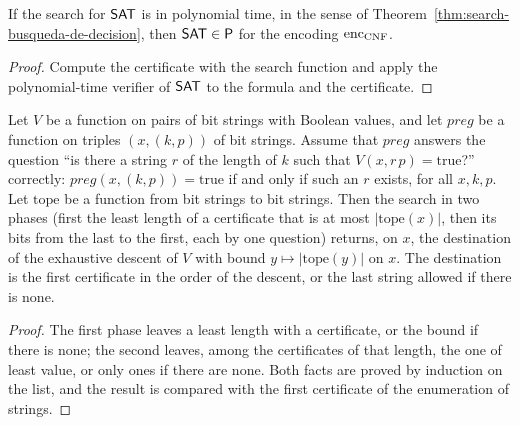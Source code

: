 \begin{theorem}
  \label{thm:search-decision-de-busqueda}
  \leanok
  If the search for $\mathsf{SAT}$ is in polynomial time, in the sense of
  Theorem~\ref{thm:search-busqueda-de-decision}, then $\mathsf{SAT} \in \mathsf{P}$ for the encoding
  $\mathrm{enc}_{\mathrm{CNF}}$.
\end{theorem}

\begin{proof}
  \leanok
  Compute the certificate with the search function and apply the polynomial-time verifier of
  $\mathsf{SAT}$ to the formula and the certificate.
\end{proof}

\begin{theorem}
  \label{thm:search-destino-busqueda}
  \leanok
  Let $V$ be a function on pairs of bit strings with Boolean values, and let $\mathit{preg}$ be a
  function on triples $(x, (k, p))$ of bit strings. Assume that $\mathit{preg}$ answers the question
  ``is there a string $r$ of the length of $k$ such that $V(x, r\,p) = \mathrm{true}$?'' correctly:
  $\mathit{preg}(x, (k, p)) = \mathrm{true}$ if and only if such an $r$ exists, for all $x, k, p$.
  Let $\mathrm{tope}$ be a function from bit strings to bit strings. Then the search in two phases
  (first the least length of a certificate that is at most $|\mathrm{tope}(x)|$, then its bits from
  the last to the first, each by one question) returns, on $x$, the destination of the exhaustive
  descent of $V$ with bound $y \mapsto |\mathrm{tope}(y)|$ on $x$. The destination is the first
  certificate in the order of the descent, or the last string allowed if there is none.
\end{theorem}

\begin{proof}
  \leanok
  The first phase leaves a least length with a certificate, or the bound if there is none; the
  second leaves, among the certificates of that length, the one of least value, or only ones if
  there are none. Both facts are proved by induction on the list, and the result is compared with
  the first certificate of the enumeration of strings.
\end{proof}

